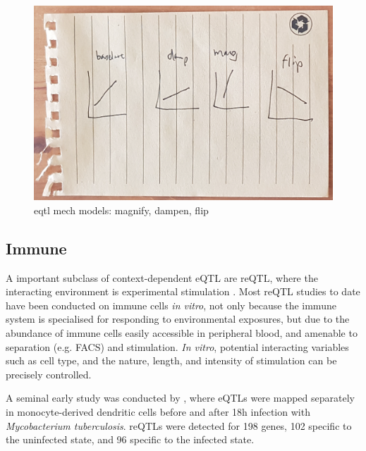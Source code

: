 \begin{outline}
\begin{figure}
    \centering
    \includegraphics[width=1.0\textwidth,page=1]{mainmatter/figures/chapter_01/fig_mockup_reQTLs_Screenshot 2020-05-21 at 17.08.49.png}
    \caption{eqtl mech models: magnify, dampen, flip}
    \label{fig:intro_reQTLmechs}
\end{figure}

\subsection{Immune }
\label{subsec:intro_reQTL}

\1 A important subclass of context-dependent \gls{eQTL} are \gls{reQTL}, where the interacting environment is experimental stimulation \autocite{vandiedonck2017GeneticAssociationMolecular,huang2019GeneticsGeneExpression}.
Most \gls{reQTL} studies to date have been conducted on immune cells \textit{in vitro}, 
not only because the immune system is specialised for responding to environmental exposures,
but due to the abundance of immune cells easily accessible in peripheral blood,
and amenable to separation (e.g. FACS) and stimulation.
    \2 \textit{In vitro}, potential interacting variables such as cell type, and the nature, length, and intensity of stimulation can be precisely controlled.

\1 A seminal early study was conducted by \autocite{barreiro2012DecipheringGeneticArchitecture}, where eQTLs were mapped separately in monocyte-derived dendritic cells before and after 18h infection with \textit{Mycobacterium tuberculosis}.
    \2 reQTLs were detected for 198 genes, 102 specific to the uninfected state, and 96 specific to the infected state. 


\end{outline}
